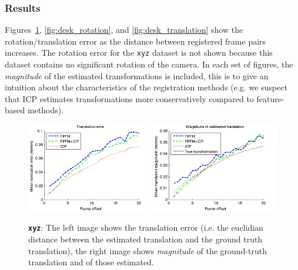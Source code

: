 \documentclass[a4paper]{article}
\begin{document}
\subsubsection{Results}

Figures~\ref{fig:xyz_translation}, \ref{fig:desk_rotation}, and \ref{fig:desk_translation} show the rotation/translation error as the distance between registered frame pairs increases. The rotation error for the \texttt{xyz} dataset is not shown because this dataset contains no significant rotation of the camera. In each set of figures, the \emph{magnitude} of the estimated transformations is included, this is to give an intuition about the characteristics of the registration methods (e.g. we suspect that \ac{ICP} estimates transformations more conservatively compared to feature-based methods). 

\begin{figure}[H]
    \centering
        \includegraphics[width=0.49\textwidth]{ims/xyzTranslationerror.png}
        \includegraphics[width=0.49\textwidth]{ims/xyzMagnitudeofestimatedtranslation.png}
    \caption{\textbf{\texttt{xyz}}: The left image shows the translation error (i.e. the euclidian distance between the estimated translation and the ground truth translation), the right image shows \emph{magnitude} of the ground-truth translation and of those estimated.}
    \label{fig:xyz_translation}
\end{figure}
\end{document}
